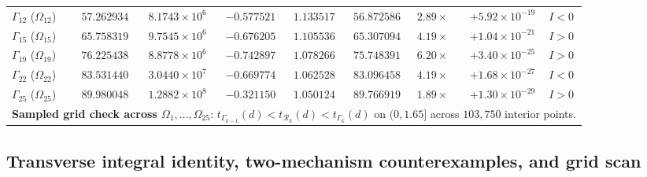 \documentclass[11pt,a4paper,reqno]{amsart}
\theoremstyle{definition}
\theoremstyle{remark}
\numberwithin{equation}{section}
\begin{document}
\begin{table}[htbp]
\begin{tabular}{lrrrrrrrc}
$\Gamma_{12}$ ($\Omega_{12}$) & $57.262934$ & $8.1743 \times 10^6$ & $-0.577521$ & $1.133517$ & $56.872586$ & $2.89\times$ & $+5.92 \times 10^{-19}$ & $I < 0$ \\
$\Gamma_{15}$ ($\Omega_{15}$) & $65.758319$ & $9.7545 \times 10^6$ & $-0.676205$ & $1.105536$ & $65.307094$ & $4.19\times$ & $+1.04 \times 10^{-21}$ & $I > 0$ \\
$\Gamma_{19}$ ($\Omega_{19}$) & $76.225438$ & $8.8778 \times 10^6$ & $-0.742897$ & $1.078266$ & $75.748391$ & $6.20\times$ & $+3.40 \times 10^{-25}$ & $I > 0$ \\
$\Gamma_{22}$ ($\Omega_{22}$) & $83.531440$ & $3.0440 \times 10^7$ & $-0.669774$ & $1.062528$ & $83.096458$ & $4.19\times$ & $+1.68 \times 10^{-27}$ & $I < 0$ \\
$\Gamma_{25}$ ($\Omega_{25}$) & $89.980048$ & $1.2882 \times 10^8$ & $-0.321150$ & $1.050124$ & $89.766919$ & $1.89\times$ & $+1.30 \times 10^{-29}$ & $I > 0$ \\
\midrule
\multicolumn{9}{l}{\textbf{Sampled grid check across $\Omega_1, \dots, \Omega_{25}$}: $t_{\Gamma_{k-1}}(d) < t_{\mathcal{R}_k}(d) < t_{\Gamma_k}(d)$ on $(0, 1.65]$ across $103{,}750$ interior points.} \\
\bottomrule
\end{tabular}
\end{table}

\subsection{Transverse integral identity, two-mechanism counterexamples, and grid scan}\label{subsec:num_integral}
\end{document}
